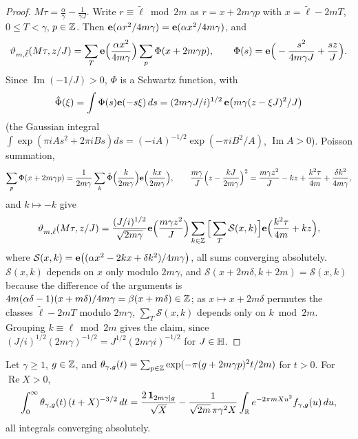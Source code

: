 \begin{proof}
$M\tau=\frac\alpha\gamma-\frac1{\gamma J}$. Write $r\equiv\tilde\ell\bmod 2m$ as $r=x+2m\gamma p$ with $x=\tilde\ell-2mT$, $0\le T<\gamma$, $p\in\mathbb{Z}$. Then $\mathbf e(\alpha r^2/4m\gamma)=\mathbf e(\alpha x^2/4m\gamma)$, and
\[
\vartheta_{m,\tilde\ell}(M\tau,z/J)=\sum_{T}\mathbf e\Big(\frac{\alpha x^2}{4m\gamma}\Big)\sum_{p}\Phi(x+2m\gamma p),\qquad \Phi(s)=\mathbf e\Big(-\frac{s^2}{4m\gamma J}+\frac{sz}J\Big).
\]
Since $\operatorname{Im}(-1/J)>0$, $\Phi$ is a Schwartz function, with
\[
\hat\Phi(\xi)=\int\Phi(s)\mathbf e(-s\xi)\,ds=(2m\gamma J/i)^{1/2}\,\mathbf e\big(m\gamma(z-\xi J)^2/J\big)
\]
(the Gaussian integral $\int\exp(\pi iAs^2+2\pi iBs)ds=(-iA)^{-1/2}\exp(-\pi iB^2/A)$, $\operatorname{Im}A>0$). Poisson summation,
\[
\sum_p\Phi(x+2m\gamma p)=\frac1{2m\gamma}\sum_k\hat\Phi\Big(\frac k{2m\gamma}\Big)\mathbf e\Big(\frac{kx}{2m\gamma}\Big),\qquad \frac{m\gamma}J\Big(z-\frac{kJ}{2m\gamma}\Big)^2=\frac{m\gamma z^2}J-kz+\frac{k^2\tau}{4m}+\frac{\delta k^2}{4m\gamma},
\]
and $k\mapsto-k$ give
\[
\vartheta_{m,\tilde\ell}(M\tau,z/J)=\frac{(J/i)^{1/2}}{\sqrt{2m\gamma}}\mathbf e\Big(\frac{m\gamma z^2}J\Big)\sum_{k\in\mathbb{Z}}\Big[\sum_T\mathcal S(x,k)\Big]\mathbf e\Big(\frac{k^2\tau}{4m}+kz\Big),
\]
where $\mathcal S(x,k)=\mathbf e\big((\alpha x^2-2kx+\delta k^2)/4m\gamma\big)$,
all sums converging absolutely. $\mathcal S(x,k)$ depends on $x$ only modulo $2m\gamma$, and $\mathcal S(x+2m\delta,k+2m)=\mathcal S(x,k)$ because the difference of the arguments is $4m(\alpha\delta-1)(x+m\delta)/4m\gamma=\beta(x+m\delta)\in\mathbb{Z}$; as $x\mapsto x+2m\delta$ permutes the classes $\tilde\ell-2mT$ modulo $2m\gamma$, $\sum_T\mathcal S(x,k)$ depends only on $k\bmod2m$. Grouping $k\equiv\ell\bmod2m$ gives the claim, since $(J/i)^{1/2}(2m\gamma)^{-1/2}=J^{1/2}(2m\gamma i)^{-1/2}$ for $J\in\mathbb{H}$.
\end{proof}

\begin{lemma}\label{circ:lem:mordell}
Let $\gamma\ge1$, $g\in\mathbb{Z}$, and $\theta_{\gamma,g}(t)=\sum_{p\in\mathbb{Z}}\exp(-\pi(g+2m\gamma p)^2t/2m)$ for $t>0$. For $\operatorname{Re}X>0$,
\[
\int_0^\infty\theta_{\gamma,g}(t)\,(t+X)^{-3/2}\,dt=\frac{2\,\mathbf 1_{2m\gamma\mid g}}{\sqrt X}-\frac1{\sqrt{2m}\,\pi\gamma^2X}\int_{\mathbb{R}}e^{-2\pi mXu^2}f_{\gamma,g}(u)\,du ,
\]
all integrals converging absolutely.
\end{lemma}


